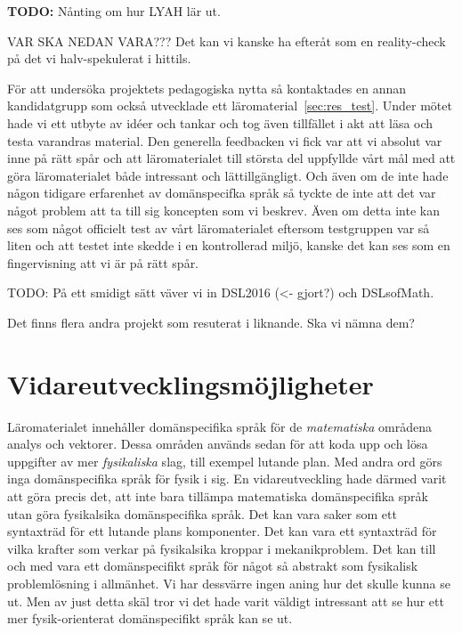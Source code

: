 \begin{draft}
\textbf{TODO:} Nånting om hur LYAH lär ut.

VAR SKA NEDAN VARA??? Det kan vi kanske ha efteråt som en reality-check på det vi halv-spekulerat i hittils.

För att undersöka projektets pedagogiska nytta så kontaktades en annan
kandidatgrupp som också utvecklade ett läromaterial~\ref{sec:res_test}. Under
mötet hade vi ett utbyte av idéer och tankar och tog även tillfället i akt att
läsa och testa varandras material. Den generella feedbacken vi fick var att vi
absolut var inne på rätt spår och att läromaterialet till största del uppfyllde
vårt mål med att göra läromaterialet både intressant och lättillgängligt. Och
även om de inte hade någon tidigare erfarenhet av domänspecifka språk så tyckte
de inte att det var något problem att ta till sig koncepten som vi beskrev. Även
om detta inte kan ses som något officielt test av vårt läromaterialet eftersom
testgruppen var så liten och att testet inte skedde i en kontrollerad miljö,
kanske det kan ses som en fingervisning att vi är på rätt spår.

\begin{binge}
TODO: På ett smidigt sätt väver vi in DSL2016 (<- gjort?) och DSLsofMath.

Det finns flera andra projekt som resuterat i liknande. Ska vi nämna dem?
\end{binge}

\section{Vidareutvecklingsmöjligheter}

Läromaterialet innehåller domänspecifika språk för de \textit{matematiska}
områdena analys och vektorer. Dessa områden används sedan för att koda upp och
lösa uppgifter av mer \textit{fysikaliska} slag, till exempel lutande plan. Med
andra ord görs inga domänspecifika språk för fysik i sig. En vidareutveckling
hade därmed varit att göra precis det, att inte bara tillämpa matematiska
domänspecifika språk utan göra fysikalsika domänspecifika språk. Det kan vara
saker som ett syntaxträd för ett lutande plans komponenter. Det kan vara ett
syntaxträd för vilka krafter som verkar på fysikalsika kroppar i mekanikproblem.
Det kan till och med vara ett domänspecifikt språk för något så abstrakt som
fysikalisk problemlösning i allmänhet. Vi har dessvärre ingen aning hur det
skulle kunna se ut. Men av just detta skäl tror vi det hade varit väldigt
intressant att se hur ett mer fysik-orienterat domänspecifikt språk kan se ut.


\end{draft}
